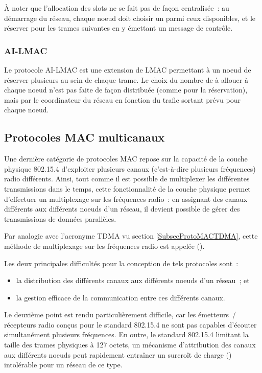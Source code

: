 À noter que l'allocation des slots ne se fait pas de façon centralisée~:
au démarrage du réseau, chaque noeud doit choisir un  parmi
ceux disponibles, et le réserver pour les trames suivantes en y émettant
un message de contrôle.

\subsubsection{AI-LMAC}
\label{ParAILMAC}

Le protocole AI-LMAC \cite{AILMAC} est une extension de LMAC permettant
à un noeud de réserver plusieurs  au sein de chaque trame.
Le choix du nombre de  à allouer à chaque noeud n'est pas
faite de façon distribuée (comme pour la réservation), mais par le
coordinateur du réseau en fonction du trafic sortant prévu pour
chaque noeud.


\subsection{Protocoles MAC multicanaux}
\label{SubsecProtoMACFDMA}

Une dernière catégorie de protocoles MAC repose sur la capacité de la
couche physique 802.15.4 d'exploiter plusieurs canaux (c'est-à-dire
plusieurs fréquences) radio différents. Ainsi, tout comme il est possible
de multiplexer les différentes transmissions dans le temps, cette
fonctionnalité de la couche physique permet d'effectuer un multiplexage sur
les fréquences radio~: en assignant des canaux différents aux différents
noeuds d'un réseau, il devient possible de gérer des transmissions de
données parallèles.

Par analogie avec l'acronyme TDMA vu section \vref{SubsecProtoMACTDMA},
cette méthode de multiplexage sur les fréquences radio est appelée
 ().

Les deux principales difficultés pour la conception de tels protocoles sont~:
\begin{itemize}
\item la distribution des différents canaux aux différents noeuds
d'un réseau~; et
\item la gestion efficace de la communication entre ces différents canaux.
\end{itemize}
Le deuxième point est rendu particulièrement difficile, car les émetteurs~/
récepteurs radio conçus pour le standard 802.15.4 ne sont pas capables
d'écouter simultanément plusieurs fréquences.
En outre, le standard 802.15.4 limitant la taille des trames physiques
à 127 octets, un mécanisme d'attribution des canaux aux différents noeuds
peut rapidement entraîner un surcroît de charge ()
intolérable pour un réseau de ce type.

